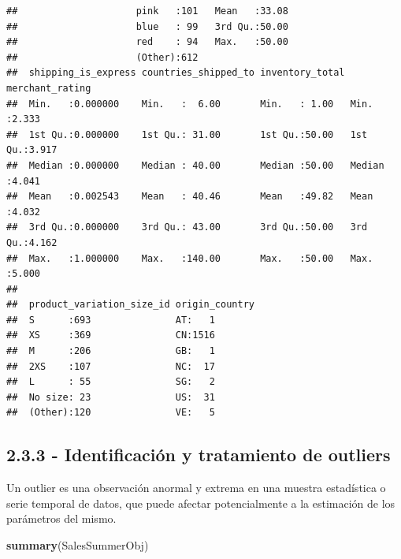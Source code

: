 \documentclass[
]{article}
\newenvironment{Shaded}{\begin{snugshade}}{\end{snugshade}}
\newcommand{\KeywordTok}[1]{\textcolor[rgb]{0.13,0.29,0.53}{\textbf{#1}}}
\newcommand{\NormalTok}[1]{#1}
\begin{document}
\begin{verbatim}
##                     pink   :101   Mean   :33.08              
##                     blue   : 99   3rd Qu.:50.00              
##                     red    : 94   Max.   :50.00              
##                     (Other):612                              
##  shipping_is_express countries_shipped_to inventory_total merchant_rating
##  Min.   :0.000000    Min.   :  6.00       Min.   : 1.00   Min.   :2.333  
##  1st Qu.:0.000000    1st Qu.: 31.00       1st Qu.:50.00   1st Qu.:3.917  
##  Median :0.000000    Median : 40.00       Median :50.00   Median :4.041  
##  Mean   :0.002543    Mean   : 40.46       Mean   :49.82   Mean   :4.032  
##  3rd Qu.:0.000000    3rd Qu.: 43.00       3rd Qu.:50.00   3rd Qu.:4.162  
##  Max.   :1.000000    Max.   :140.00       Max.   :50.00   Max.   :5.000  
##                                                                          
##  product_variation_size_id origin_country
##  S      :693               AT:   1       
##  XS     :369               CN:1516       
##  M      :206               GB:   1       
##  2XS    :107               NC:  17       
##  L      : 55               SG:   2       
##  No size: 23               US:  31       
##  (Other):120               VE:   5
\end{verbatim}

\hypertarget{identificaciuxf3n-y-tratamiento-de-outliers}{%
\subsection{2.3.3 - Identificación y tratamiento de
outliers}\label{identificaciuxf3n-y-tratamiento-de-outliers}}

Un outlier es una observación anormal y extrema en una muestra
estadística o serie temporal de datos, que puede afectar potencialmente
a la estimación de los parámetros del mismo.

\begin{Shaded}
\begin{Highlighting}[]
\KeywordTok{summary}\NormalTok{(SalesSummerObj)}
\end{Highlighting}
\end{Shaded}
\end{document}
